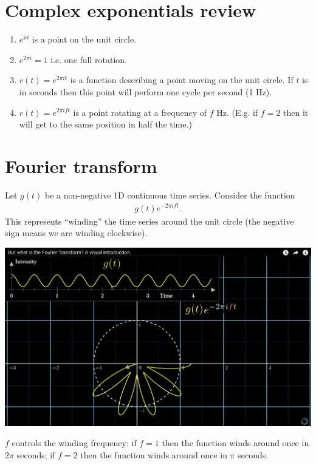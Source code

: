 \section{Complex exponentials review}
\begin{enumerate}
\item $e^{xi}$ is a point on the unit circle.
\item $e^{2\pi i} = 1$ i.e. one full rotation.
\item $r(t) = e^{2\pi i t}$ is a function describing a point moving on the unit circle. If $t$ is in seconds then
  this point will perform one cycle per second (1 Hz).
\item $r(t) = e^{2\pi i f t}$ is a point rotating at a frequency of $f$ Hz. (E.g. if $f = 2$ then it will get to
  the same position in half the time.)
\end{enumerate}



\section{Fourier transform}

Let $g(t)$ be a non-negative 1D continuous time series. Consider the function
\begin{align*}
  g(t)e^{-2\pi i f t}.
\end{align*}
This represents ``winding'' the time series around the unit circle (the negative sign means we are winding
clockwise).

\begin{mdframed}
\includegraphics[width=400pt]{img/fourier--complex-exponentials-review--fourier-transform-75f4.png}
\end{mdframed}

$f$ controls the winding frequency: if $f = 1$ then the function winds around once in $2\pi$ seconds;
if $f = 2$ then the function winds around once in $\pi$ seconds.

